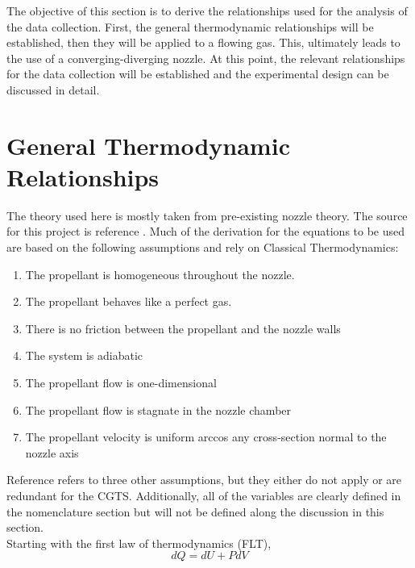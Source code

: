The objective of this section is to derive the relationships used for the analysis of the data collection. First, the general thermodynamic relationships will be established, then they will be applied to a flowing gas. This, ultimately leads to the use of a converging-diverging nozzle. At this point, the relevant relationships for the data collection will be established and the experimental design can be discussed in detail.
\section{General Thermodynamic Relationships}
The theory used here is mostly taken from pre-existing nozzle theory. The source for this project is reference \cite{langton}. Much of the derivation for the equations to be used are based on the following assumptions and rely on Classical Thermodynamics:
\begin{enumerate}
\item The propellant is homogeneous throughout the nozzle.
\item The propellant behaves like a perfect gas.
\item There is no friction between the propellant and the nozzle walls
\item The system is adiabatic
\item The propellant flow is one-dimensional
\item The propellant flow is stagnate in the nozzle chamber
\item The propellant velocity is uniform arccos any cross-section normal to the nozzle axis
\end{enumerate}
Reference \cite{langton} refers to three other assumptions, but they either do not apply or are redundant for the CGTS. Additionally, all of the variables are clearly defined in the nomenclature section but will not be defined along the discussion in this section.\\
Starting with the first law of thermodynamics (FLT),
\begin{equation}\label{eq:FLT}
dQ=dU+PdV
\end{equation}%
%
%
%
%
%
%
%
